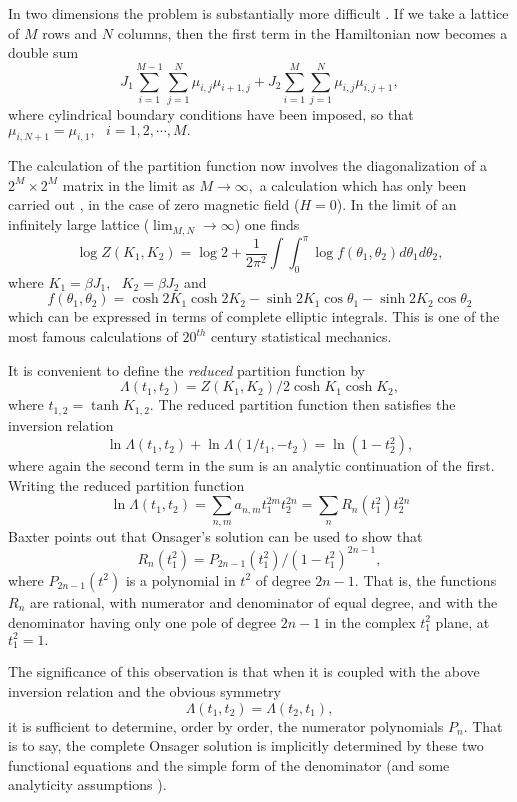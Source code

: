 In two dimensions the problem is substantially more difficult \cite{Tho}.
If we take a lattice of $M$ rows and $N$ columns, then 
 the first term in the Hamiltonian now becomes a double sum
 \begin{equation}
J_1\sum_{i=1}^{M-1} \sum_{j=1}^N \mu_{i,j} \mu_{i+1,j} +J_2 \sum_{i=1}^M \sum_{j=1}^N \mu_{i,j} \mu_{i,j+1},
\end{equation}
where cylindrical boundary conditions have been imposed, so that
$\mu_{i,N+1}=\mu_{i,1}, \mbox{    } i=1,2,\cdots,M.$

The calculation of the partition function now involves the diagonalization
of a $2^M \times 2^M$ matrix in the limit as $M \rightarrow \infty,$
a calculation which has only been carried out \cite{Ons}, \cite{Tho} in
the case of zero magnetic field ($H=0$). In the limit of an infinitely
large lattice ($\lim_{M,N} \rightarrow \infty$) one finds
$$\log Z(K_1,K_2) = \log 2 + \frac{1}{2\pi^2}\int\int_{0}^{\pi} \log f(\theta_1,\theta_2)d\theta_1 d\theta_2, $$
where $K_1 = \beta J_1, \mbox{ } K_2 = \beta J_2$ and 
$$f(\theta_1,\theta_2) = \cosh 2K_1\cosh 2K_2-\sinh 2K_1\cos \theta_1- \sinh 2K_2 \cos \theta_2$$
which can be expressed in terms of complete
elliptic integrals. This is one of the most famous calculations of  $20^{th}$ century
statistical mechanics.

It is convenient to define the {\em reduced} partition function by
$$\Lambda(t_1,t_2) = Z(K_1,K_2)/2\cosh K_1\cosh K_2,$$ where $t_{1,2}
=\tanh K_{1,2}.$ The reduced partition function then \cite{Bax80}
satisfies the inversion relation
$$\ln \Lambda(t_1,t_2) + \ln \Lambda(1/t_1,-t_2) = \ln(1 - t_2^2),$$
where again the second term in the sum is an analytic continuation of
the first.
Writing the reduced partition function
$$\ln \Lambda(t_1,t_2) = \sum_{n,m} a_{n,m}t_1^{2m}t_2^{2n} = \sum_n
R_n(t_1^2)t_2^{2n}$$
Baxter \cite{Bax80} points out that Onsager's solution can be used to show
that
$$R_n(t_1^2) = P_{2n-1}(t_1^2)/(1 - t_1^2)^{2n-1},$$
where $P_{2n-1}(t^2)$ is a polynomial in $t^2$ of degree $2n-1.$
That is, the functions $R_n$ are rational, with numerator and denominator
of equal degree, and with the denominator having only one
pole of degree $2n-1$ in the complex $t_1^2$ plane, at $t_1^2 = 1.$

The significance of this observation is that when it is coupled with the above 
inversion relation and the obvious symmetry 
$$\Lambda(t_1,t_2) =  \Lambda(t_2,t_1),$$ it is sufficient to determine,
order by order, the numerator polynomials $P_n.$ That is to say, the
complete Onsager solution is implicitly determined by these two functional
equations and the simple form of the denominator (and some analyticity
assumptions \cite{Bax80}).

